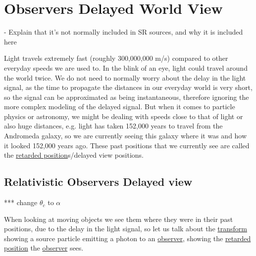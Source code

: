 \chapter{Observers Delayed World View} \label{ch: Observers Delayed World View}

- Explain that it's not normally included in SR sources, and why it is included here

Light travels extremely fast (roughly 300,000,000 m/s) compared to other everyday speeds we are used to.
In the blink of an eye, light could travel around the world twice.
We do not need to normally worry about the delay in the light signal, as the time to propagate the distances in our everyday world is very short, so the signal can be approximated as being instantaneous, therefore ignoring the more complex modeling of the delayed signal.
But when it comes to particle physics or astronomy, we might be dealing with speeds close to that of light or also huge distances, e.g.
light has taken 152,000 years to travel from the Andromeda galaxy, so we are currently seeing this galaxy where it was and how it looked 152,000 years ago.
These past positions that we currently see are called the \hyperlink{def-retarded-position}{retarded position}s/delayed view positions.

\section{Relativistic Observers Delayed view} \label{sect: Relativistic Observers Delayed view}

*** change ${\theta_c}$ to ${\alpha}$

When looking at moving objects we see them where they were in their past positions, due to the delay in the light signal, so let us talk about the \hyperlink{def-transform}{transform} showing a source particle emitting a photon to an \hyperlink{def-observer}{observer}, showing the \hyperlink{def-retarded-position}{retarded position} the \hyperlink{def-observer}{observer} sees.


